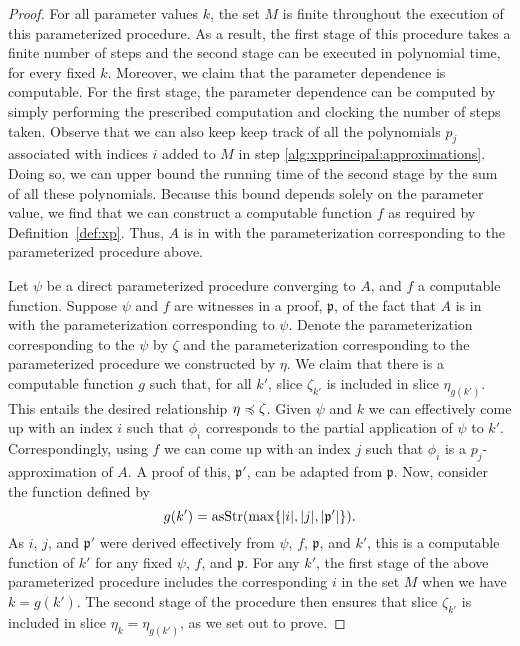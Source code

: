 \begin{proof}
  For all parameter values $k$, the set $M$ is finite throughout the execution of this parameterized procedure.
  As a result, the first stage of this procedure takes a finite number of steps and the second stage can be executed in polynomial time, for every fixed $k$.
  Moreover, we claim that the parameter dependence is computable.
  For the first stage, the parameter dependence can be computed by simply performing the prescribed computation and clocking the number of steps taken.
  Observe that we can also keep keep track of all the polynomials $p_j$ associated with indices $i$ added to $M$ in step \ref{alg:xpprincipal:approximations}.
  Doing so, we can upper bound the running time of the second stage by the sum of all these polynomials.
  Because this bound depends solely on the parameter value, we find that we can construct a computable function $f$ as required by Definition~\ref{def:xp}.
  Thus, $A$ is in  with the parameterization corresponding to the parameterized procedure above.

  Let $\psi$ be a direct parameterized procedure converging to $A$, and $f$ a computable function.
  Suppose $\psi$ and $f$ are witnesses in a proof, $\mathfrak{p}$, of the fact that $A$ is in  with the parameterization corresponding to $\psi$.
  Denote the parameterization corresponding to the $\psi$ by $\zeta$ and the parameterization corresponding to the parameterized procedure we constructed by $\eta$.
  We claim that there is a computable function $g$ such that, for all $k'$, slice $\zeta_{k'}$ is included in slice $\eta_{g(k')}$.
  This entails the desired relationship $\eta \preccurlyeq \zeta$.
  Given $\psi$ and $k$ we can effectively come up with an index $i$ such that $\phi_i$ corresponds to the partial application of $\psi$ to $k'$.
  Correspondingly, using $f$ we can come up with an index $j$ such that $\phi_i$ is a $p_j$-approximation of $A$.
  A proof of this, $\mathfrak{p}'$, can be adapted from $\mathfrak{p}$.
  Now, consider the function defined by
  \begin{equation*}
    g(k') = \operatorname{asStr}(\max\{{\lvert i\rvert}, {\lvert j\rvert}, {\lvert\mathfrak{p}'\rvert}\}).
  \end{equation*}
  As $i$, $j$, and $\mathfrak{p}'$ were derived effectively from $\psi$, $f$, $\mathfrak{p}$, and $k'$, this is a computable function of $k'$ for any fixed $\psi$, $f$, and $\mathfrak{p}$.
  For any $k'$, the first stage of the above parameterized procedure includes the corresponding $i$ in the set $M$ when we have $k = g(k')$.
  The second stage of the procedure then ensures that slice $\zeta_{k'}$ is included in slice $\eta_k = \eta_{g(k')}$, as we set out to prove.
\end{proof}

